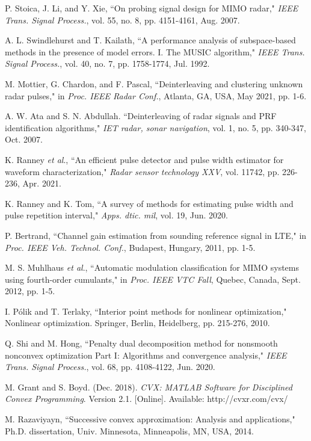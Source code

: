 \documentclass[10pt,final,doublecolumn]{IEEEtran}
\begin{document}
\begin{thebibliography}{1}
P. Stoica, J. Li, and Y. Xie, ``On probing signal design for MIMO radar,"
\emph{IEEE Trans. Signal Process.}, vol. 55, no. 8, pp. 4151-4161, Aug. 2007.

A. L. Swindlehurst and T. Kailath, ``A performance analysis of subspace-based methods in the presence of model errors. I. The MUSIC algorithm," \emph{IEEE Trans. Signal Process.}, vol. 40, no. 7, pp. 1758-1774, Jul. 1992.


M. Mottier, G. Chardon, and F. Pascal, ``Deinterleaving and clustering unknown radar pulses," in \emph{ Proc. IEEE Radar Conf.}, Atlanta, GA, USA, May 2021, pp. 1-6.

A. W. Ata and S. N. Abdullah. ``Deinterleaving of radar signals and PRF identification algorithms," \emph{IET radar, sonar navigation}, vol. 1, no. 5, pp. 340-347, Oct. 2007.

K. Ranney \emph{et al}., ``An efficient pulse detector and pulse width estimator for waveform characterization," \emph{Radar sensor technology XXV}, vol. 11742, pp. 226-236, Apr. 2021.

K. Ranney and K. Tom, ``A survey of methods for estimating pulse width and pulse repetition interval," \emph{Apps. dtic. mil}, vol. 19, Jun. 2020.

P. Bertrand, ``Channel gain estimation from sounding reference signal in LTE," in \emph{Proc. IEEE Veh. Technol. Conf.}, Budapest, Hungary, 2011, pp. 1-5.

M. S. Muhlhaus \emph{et al}., ``Automatic modulation
classification for MIMO systems using fourth-order cumulants," in \emph{Proc.
IEEE VTC Fall}, Quebec, Canada, Sept. 2012, pp. 1-5.


I. P\'olik and T. Terlaky, ``Interior point methods for nonlinear optimization," Nonlinear optimization. Springer, Berlin, Heidelberg, pp. 215-276, 2010.

Q. Shi and M. Hong, ``Penalty dual decomposition method for nonsmooth
nonconvex optimization Part I: Algorithms and convergence analysis,"
\emph{IEEE Trans. Signal Process.}, vol. 68, pp. 4108-4122, Jun. 2020.

M. Grant and S. Boyd. (Dec. 2018). \emph{CVX: MATLAB Software for
Disciplined Convex Programming}. Version 2.1. [Online]. Available:
http://cvxr.com/cvx/

M. Razaviyayn, ``Successive convex approximation: Analysis and applications," Ph.D. dissertation, Univ. Minnesota, Minneapolis, MN, USA, 2014.
\end{thebibliography}
\end{document}

